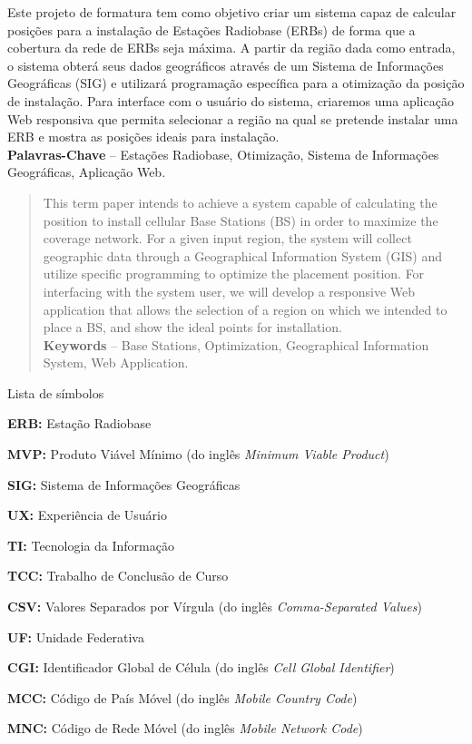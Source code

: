 \documentclass[]{politex}
\begin{document}
\begin{resumo}
Este projeto de formatura tem como objetivo criar um sistema capaz de calcular
posições para a instalação de Estações Radiobase (ERBs) de forma que a
cobertura da rede de ERBs seja máxima. A partir da região dada como entrada, o
sistema obterá seus dados geográficos através de um Sistema de Informações
Geográficas (SIG) e utilizará programação específica para a otimização da posição
de instalação. Para interface com o usuário do sistema, criaremos uma aplicação
Web responsiva que permita selecionar a região na qual se pretende instalar uma
ERB e mostra as posições ideais para instalação.
\\[3\baselineskip]
%
\textbf{Palavras-Chave} -- Estações Radiobase, Otimização, Sistema de
Informações Geográficas, Aplicação Web.
\end{resumo}


\begin{abstract}
This term paper intends to achieve a system capable of calculating the position
to install cellular Base Stations (BS) in order to maximize the coverage
network. For a given input region, the system will collect geographic data
through a Geographical Information System (GIS) and utilize specific programming
to optimize the placement position. For interfacing with the system user, we
will develop a responsive Web application that allows the selection of a region
on which we intended to place a BS, and show the ideal points for installation.
\\[3\baselineskip]
%
\textbf{Keywords} -- Base Stations, Optimization, Geographical Information
System, Web Application.
\end{abstract}


\listadefiguras
\listadetabelas

\begin{pretextualsection}{Lista de símbolos}

\textbf{ERB:} Estação Radiobase

\textbf{MVP:} Produto Viável Mínimo (do inglês \textit{Minimum Viable Product})

\textbf{SIG:} Sistema de Informações Geográficas

\textbf{UX:} Experiência de Usuário

\textbf{TI:} Tecnologia da Informação

\textbf{TCC:} Trabalho de Conclusão de Curso

\textbf{CSV:} Valores Separados por Vírgula (do inglês \textit{Comma-Separated Values})

\textbf{UF:} Unidade Federativa

\textbf{CGI:} Identificador Global de Célula (do inglês \textit{Cell Global Identifier})

\textbf{MCC:} Código de País Móvel (do inglês \textit{Mobile Country Code})

\textbf{MNC:} Código de Rede Móvel (do inglês \textit{Mobile Network Code})

\end{pretextualsection}
\end{document}
